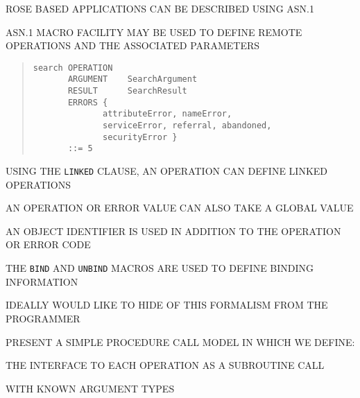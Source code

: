 \begin{bwslide}

\begin{nrtc}
\item	ROSE BASED APPLICATIONS CAN BE DESCRIBED USING ASN.1
\item	ASN.1 MACRO FACILITY MAY BE USED TO DEFINE REMOTE OPERATIONS
	AND THE ASSOCIATED PARAMETERS
\end{nrtc}
\end{bwslide}


\begin{bwslide}

\begin{quote}\small\begin{verbatim}
search OPERATION
       ARGUMENT    SearchArgument
       RESULT      SearchResult
       ERRORS {
              attributeError, nameError,
              serviceError, referral, abandoned,
              securityError }
       ::= 5
\end{verbatim}\end{quote}
\end{bwslide}

\begin{bwslide}

\begin{nrtc}
\item   USING THE \verb"LINKED" CLAUSE, AN OPERATION CAN DEFINE LINKED
        OPERATIONS

\item   AN OPERATION OR ERROR VALUE CAN ALSO TAKE A GLOBAL VALUE
    \begin{nrtc}
    \item       AN OBJECT IDENTIFIER IS USED IN ADDITION TO THE
                OPERATION OR ERROR CODE
    \end{nrtc}

\item   THE \verb"BIND" AND \verb"UNBIND" MACROS ARE USED TO DEFINE BINDING
        INFORMATION
\end{nrtc}
\end{bwslide}


\begin{bwslide}

\begin{nrtc}
\item   IDEALLY WOULD LIKE TO HIDE OF THIS FORMALISM FROM THE PROGRAMMER

\item   PRESENT A SIMPLE PROCEDURE CALL MODEL IN WHICH WE DEFINE:
        \begin{nrtc}
        \item   THE INTERFACE TO EACH OPERATION AS A SUBROUTINE CALL

        \item   WITH KNOWN ARGUMENT TYPES
        \end{nrtc}
\end{nrtc}
\end{bwslide}


